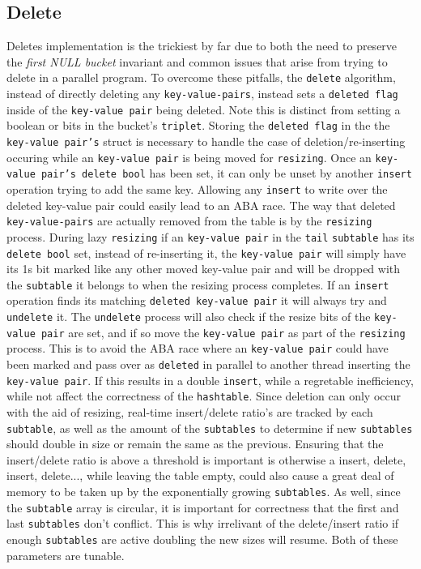 \subsection{Delete}
Deletes implementation is the trickiest by far due to both the need to
preserve the \textit{first NULL bucket} invariant and common issues
that arise from trying to delete in a parallel program. To overcome
these pitfalls, the \texttt{delete} algorithm, instead of directly
deleting any \texttt{key-value-pairs}, instead sets a \texttt{deleted
  flag} inside of the \texttt{key-value pair} being deleted. Note this
is distinct from setting a boolean or bits in the bucket's
\texttt{triplet}. Storing the \texttt{deleted flag} in the the
\texttt{key-value pair's} struct is necessary to handle the case of
deletion/re-inserting occuring while an \texttt{key-value pair} is
being moved for \texttt{resizing}. Once an \texttt{key-value pair's
  delete bool} has been set, it can only be unset by another
\texttt{insert} operation trying to add the same key. Allowing any
\texttt{insert} to write over the deleted key-value pair could easily
lead to an ABA race. The way that deleted \texttt{key-value-pairs} are
actually removed from the table is by the \texttt{resizing}
process. During lazy \texttt{resizing} if an \texttt{key-value pair}
in the \texttt{tail} \texttt{subtable} has its \texttt{delete bool}
set, instead of re-inserting it, the \texttt{key-value pair} will
simply have its 1s bit marked like any other moved key-value pair and
will be dropped with the \texttt{subtable} it belongs to when the
resizing process completes. If an \texttt{insert} operation finds its
matching \texttt{deleted key-value pair} it will always try and
\texttt{undelete} it. The \texttt{undelete} process will also check if
the resize bits of the \texttt{key-value pair} are set, and if so move
the \texttt{key-value pair} as part of the \texttt{resizing}
process. This is to avoid the ABA race where an \texttt{key-value
  pair} could have been marked and pass over as \texttt{deleted} in
parallel to another thread inserting the \texttt{key-value pair}. If
this results in a double \texttt{insert}, while a regretable
inefficiency, while not affect the correctness of the
\texttt{hashtable}. Since deletion can only occur with the aid of
resizing, real-time insert/delete ratio's are tracked by each
\texttt{subtable}, as well as the amount of the \texttt{subtables} to
determine if new \texttt{subtables} should double in size or remain
the same as the previous. Ensuring that the insert/delete ratio is
above a threshold is important is otherwise a insert, delete, insert,
delete..., while leaving the table empty, could also cause a great
deal of memory to be taken up by the exponentially growing
\texttt{subtables}. As well, since the \texttt{subtable} array is
circular, it is important for correctness that the first and last
\texttt{subtables} don't conflict. This is why irrelivant of the
delete/insert ratio if enough \texttt{subtables} are active doubling
the new sizes will resume. Both of these parameters are tunable.







